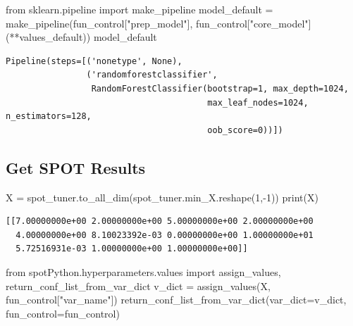 \documentclass[
  letterpaper,
  DIV=11,
  numbers=noendperiod]{scrreprt}
\newenvironment{Shaded}{\begin{snugshade}}{\end{snugshade}}
\newcommand{\BuiltInTok}[1]{\textcolor[rgb]{0.00,0.23,0.31}{#1}}
\newcommand{\DecValTok}[1]{\textcolor[rgb]{0.68,0.00,0.00}{#1}}
\newcommand{\ImportTok}[1]{\textcolor[rgb]{0.00,0.46,0.62}{#1}}
\newcommand{\NormalTok}[1]{\textcolor[rgb]{0.00,0.23,0.31}{#1}}
\newcommand{\OperatorTok}[1]{\textcolor[rgb]{0.37,0.37,0.37}{#1}}
\newcommand{\StringTok}[1]{\textcolor[rgb]{0.13,0.47,0.30}{#1}}
\begin{document}
\begin{Shaded}
\begin{Highlighting}[]
\ImportTok{from}\NormalTok{ sklearn.pipeline }\ImportTok{import}\NormalTok{ make\_pipeline}
\NormalTok{model\_default }\OperatorTok{=}\NormalTok{ make\_pipeline(fun\_control[}\StringTok{"prep\_model"}\NormalTok{], fun\_control[}\StringTok{"core\_model"}\NormalTok{](}\OperatorTok{**}\NormalTok{values\_default))}
\NormalTok{model\_default}
\end{Highlighting}
\end{Shaded}

\begin{verbatim}
Pipeline(steps=[('nonetype', None),
                ('randomforestclassifier',
                 RandomForestClassifier(bootstrap=1, max_depth=1024,
                                        max_leaf_nodes=1024, n_estimators=128,
                                        oob_score=0))])
\end{verbatim}

\hypertarget{get-spot-results-1}{%
\subsection{Get SPOT Results}\label{get-spot-results-1}}

\begin{Shaded}
\begin{Highlighting}[]
\NormalTok{X }\OperatorTok{=}\NormalTok{ spot\_tuner.to\_all\_dim(spot\_tuner.min\_X.reshape(}\DecValTok{1}\NormalTok{,}\OperatorTok{{-}}\DecValTok{1}\NormalTok{))}
\BuiltInTok{print}\NormalTok{(X)}
\end{Highlighting}
\end{Shaded}

\begin{verbatim}
[[7.00000000e+00 2.00000000e+00 5.00000000e+00 2.00000000e+00
  4.00000000e+00 8.10023392e-03 0.00000000e+00 1.00000000e+01
  5.72516931e-03 1.00000000e+00 1.00000000e+00]]
\end{verbatim}

\begin{Shaded}
\begin{Highlighting}[]
\ImportTok{from}\NormalTok{ spotPython.hyperparameters.values }\ImportTok{import}\NormalTok{ assign\_values, return\_conf\_list\_from\_var\_dict}
\NormalTok{v\_dict }\OperatorTok{=}\NormalTok{ assign\_values(X, fun\_control[}\StringTok{"var\_name"}\NormalTok{])}
\NormalTok{return\_conf\_list\_from\_var\_dict(var\_dict}\OperatorTok{=}\NormalTok{v\_dict, fun\_control}\OperatorTok{=}\NormalTok{fun\_control)}
\end{Highlighting}
\end{Shaded}
\end{document}
